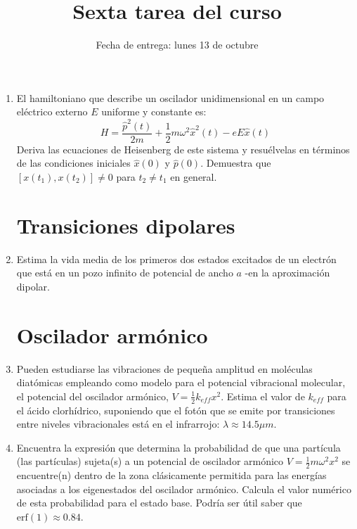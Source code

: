 \documentclass[10pt,letterpaper]{article}
\title{Sexta tarea del curso}
\date{Fecha de entrega: lunes 13 de octubre}
\begin{document}
\maketitle



\begin{enumerate}


\section{Ecuaciones de Heisenberg y el oscilador}
\item El hamiltoniano que describe un oscilador unidimensional en un campo eléctrico externo $E$ uniforme y constante es:
\begin{equation*}
H=\frac{\hat{p}^2(t)}{2m}+\frac{1}{2}m\omega^2\hat{x}^2(t)-eE\hat{x}(t)
\end{equation*}
Deriva las ecuaciones de Heisenberg de este sistema y resuélvelas en términos de las condiciones iniciales $\hat{x}(0)$ y $\hat{p}(0)$. Demuestra que $[x(t_1),x(t_2)]\neq 0$ para $t_2 \neq t_1$ en general.

\section{Transiciones dipolares}
\item Estima la vida media de los primeros dos estados excitados de un electrón que está en un pozo infinito de potencial de ancho $a$ -en la aproximación dipolar.

\section{Oscilador armónico}
\item Pueden estudiarse las vibraciones de pequeña amplitud en moléculas diatómicas empleando como modelo para el potencial vibracional molecular, el potencial del oscilador armónico, $V=\frac{1}{2}k_{eff} x^2$. Estima el valor de $k_{eff}$ para el ácido clorhídrico, suponiendo que el fotón que se emite por transiciones entre niveles vibracionales está en el infrarrojo: $\lambda\approx 14.5\mu m$.

\item Encuentra la expresión que determina la probabilidad de que una partícula (las partículas) sujeta(s) a un potencial de oscilador armónico $V=\frac{1}{2}m\omega^2 x^2$ se encuentre(n) dentro de la zona clásicamente permitida para las energías asociadas a los eigenestados del oscilador armónico. Calcula el valor numérico de esta probabilidad para el estado base. Podría ser útil saber que $\text{erf} (1) \approx 0.84$.

\end{enumerate}
\end{document}

